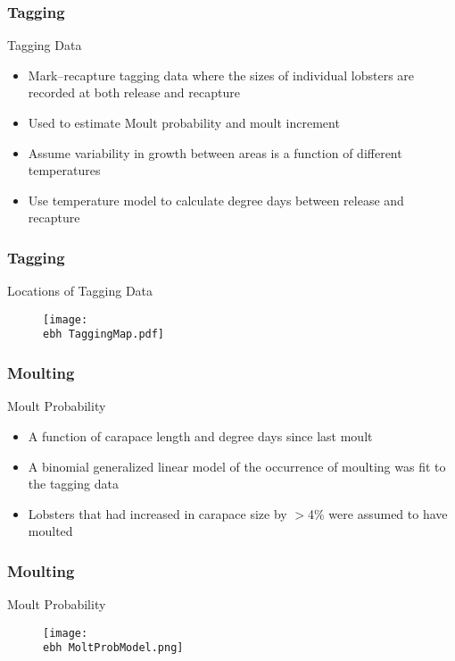 \documentclass{beamer}
\newcommand{\ebh}{\string~/bio.data/bio.lobster/figures/LFA2733Framework2018/} %
\begin{document}
\begin{frame}
\frametitle{Tagging}
Tagging Data
\begin{itemize}
\item Mark–recapture tagging data where the sizes of individual lobsters are recorded at both release and recapture
\item Used to estimate Moult probability and moult increment
\item Assume variability in growth between areas is a function of different temperatures
\item Use temperature model to calculate degree days between release and recapture
\end{itemize}
\end{frame}


\begin{frame}
\frametitle{Tagging}
Locations of Tagging Data
\begin{figure}
        \begin{center}
            \texttt{[image: \\ebh TaggingMap.pdf]}
        \end{center}
    \end{figure}
\end{frame}


\begin{frame}
\frametitle{Moulting}
Moult Probability 
\begin{itemize}
\item A function of carapace length and degree days since last moult
\item A binomial generalized linear model of the occurrence of moulting was fit to the tagging data
\item Lobsters that had increased in carapace size by $>$4\% were assumed to have moulted
\end{itemize}
\end{frame}



\begin{frame}
\frametitle{Moulting}
Moult Probability 
\begin{figure}
        \begin{center}
            \texttt{[image: \\ebh MoltProbModel.png]}
        \end{center}
    \end{figure}
\end{frame}
\end{document}
